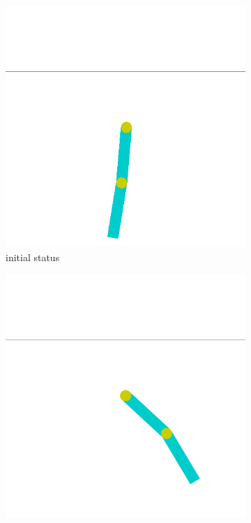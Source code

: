 \documentclass[11pt]{article}
\begin{document}
\begin{figure}[h]
  \begin{subfigure}{0.33\textwidth}
    \centering
    \includegraphics[width=0.9\linewidth]{img11}
    \caption{initial status}
  \end{subfigure}%
    \begin{subfigure}{0.33\textwidth}
    \centering
    \includegraphics[width=0.9\linewidth]{img12}

\end{subfigure}
\end{figure}
\end{document}
